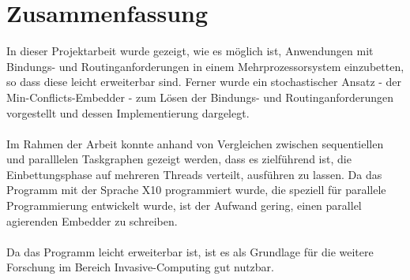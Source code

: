 \chapter{Zusammenfassung}\label{zusammenfassung}

In dieser Projektarbeit wurde gezeigt, wie es möglich ist, Anwendungen mit Bindungs- und Routinganforderungen in einem Mehrprozessorsystem einzubetten, so dass diese leicht erweiterbar sind. Ferner wurde ein stochastischer Ansatz - der Min-Conflicts-Embedder - zum Lösen der Bindungs- und Routinganforderungen vorgestellt und dessen Implementierung dargelegt.\\
\\
Im Rahmen der Arbeit konnte anhand von Vergleichen zwischen sequentiellen und paralllelen Taskgraphen gezeigt werden, dass es zielführend ist, die Einbettungsphase auf mehreren Threads verteilt, ausführen zu lassen. Da das Programm mit der Sprache X10 programmiert wurde, die speziell für parallele Programmierung entwickelt wurde, ist der Aufwand gering, einen parallel agierenden Embedder zu schreiben.\\
\\
Da das Programm leicht erweiterbar ist, ist es als Grundlage für die weitere Forschung im Bereich Invasive-Computing \cite{invasiveComputing} gut nutzbar.


